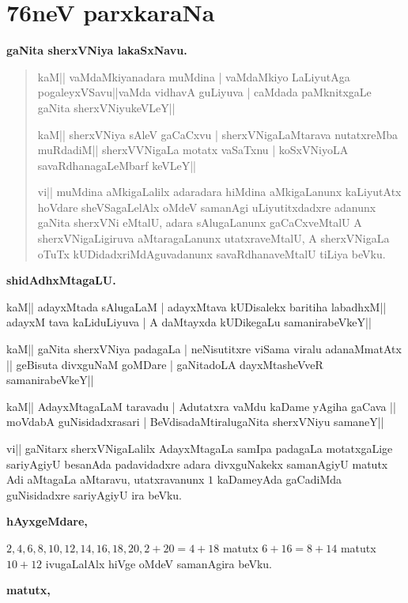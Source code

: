 \chapter{76neV parxkaraNa}

\begin{center}
{\bf gaNita sherxVNiya lakaSxNavu.}
\end{center}

\begin{verse}
kaM|| vaMdaMkiyanadara muMdina | vaMdaMkiyo LaLiyutAga pogaleyxVSavu||vaMda vidhavA guLiyuva | caMdada paMknitxgaLe gaNita sherxVNiyukeVLeY||

kaM|| sherxVNiya sAleV gaCaCxvu | sherxVNigaLaMtarava nutatxreMba muRdadiM|| sherxVVNigaLa motatx vaSaTxnu | koSxVNiyoLA savaRdhanagaLeMbarf keVLeY||

vi|| muMdina aMkigaLalilx adaradara hiMdina aMkigaLanunx kaLiyutAtx hoVdare sheVSagaLelAlx oMdeV samanAgi uLiyutitxdadxre adanunx gaNita sherxVNi eMtalU, adara sAlugaLanunx gaCaCxveMtalU A sherxVNigaLigiruva aMtaragaLanunx utatxraveMtalU, A sherxVNigaLa oTuTx kUDidadxriMdAguvadanunx savaRdhanaveMtalU tiLiya beVku.
\end{verse}

\begin{center}
{\bf shidAdhxMtagaLU.}
\end{center}

kaM|| adayxMtada sAlugaLaM | adayxMtava kUDisalekx baritiha labadhxM|| adayxM tava kaLiduLiyuva | A daMtayxda kUDikegaLu samanirabeVkeY||

kaM|| gaNita sherxVNiya padagaLa | neNisutitxre viSama viralu adanaMmatAtx || geBisuta divxguNaM goMDare | gaNitadoLA dayxMtasheVveR samanirabeVkeY||

kaM|| AdayxMtagaLaM taravadu | Adutatxra vaMdu kaDame yAgiha gaCava || moVdabA guNisidadxrasari | BeVdisadaMtiralugaNita sherxVNiyu samaneY||

vi|| gaNitarx sherxVNigaLalilx AdayxMtagaLa samIpa padagaLa motatxgaLige sariyAgiyU besanAda padavidadxre adara divxguNakekx samanAgiyU matutx Adi aMtagaLa aMtaravu, utatxravanunx $1$ kaDameyAda gaCadiMda guNisidadxre sariyAgiyU ira beVku.

\begin{center}
{\bf hAyxgeMdare,}
\end{center}

$2,4,6,8,10,12,14,16,18,20,2 + 20 =4 + 18$ matutx $6+16=8+14$ matutx $10+12$ ivugaLalAlx hiVge oMdeV samanAgira beVku.

\begin{center}
{\bf matutx,}
\end{center}

